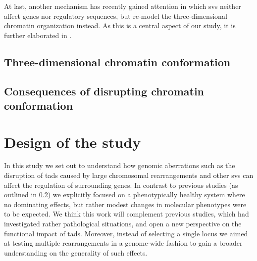 At last, another mechanism has recently gained attention in which \acp{sv}
neither affect genes nor regulatory sequences, but re-model the
three-dimensional chromatin organization instead. As this is a central aspect of
our study, it is further elaborated in .




\subsection{Three-dimensional chromatin conformation}
\label{sec:chromatin_conformation}







\subsection{Consequences of disrupting chromatin conformation}
\label{sec:disrupting_tads}






\section{Design of the study}
\label{sec:balancer_study_design}

In this study we set out to understand how genomic aberrations such as the
disruption of \acp{tad} caused by large chromosomal rearrangements and other
\acp{sv} can affect the regulation of surrounding genes. In contrast to previous
studies (as outlined in \cref{sec:disrupting_tads}) we explicitly
focused on a phenotypically healthy system where no dominating effects, but
rather modest changes in molecular phenotypes were to be expected. We think this
work will complement previous studies, which had investigated rather
pathological situations, and open a new perspective on the functional impact of
\acp{tad}. Moreover, instead of selecting a single locus we aimed at testing
multiple rearrangements in a genome-wide fashion to gain a broader understanding
on the generality of such effects.




